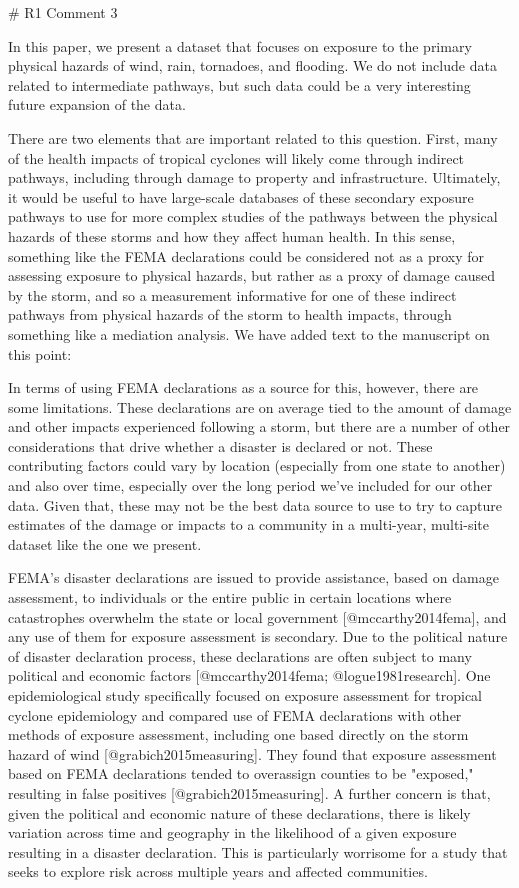 # R1 Comment 3

In this paper, we present a dataset that focuses on exposure to the primary
physical hazards of wind, rain, tornadoes, and flooding. We do not include data
related to intermediate pathways, but such data could be a very interesting
future expansion of the data.

There are two elements that are important related to this question. First, many
of the health impacts of tropical cyclones will likely come through indirect
pathways, including through damage to property and infrastructure. Ultimately,
it would be useful to have large-scale databases of these secondary exposure
pathways to use for more complex studies of the pathways between the physical
hazards of these storms and how they affect human health. In this sense,
something like the FEMA declarations could be considered not as a proxy for
assessing exposure to physical hazards, but rather as a proxy of damage caused
by the storm, and so a measurement informative for one of these indirect
pathways from physical hazards of the storm to health impacts, through something
like a mediation analysis. We have added text to the manuscript on this point:


In terms of using FEMA declarations as a source for this, however, there are 
some limitations. These declarations are on average tied to the amount of 
damage and other impacts experienced following a storm, but there are a number
of other considerations that drive whether a disaster is declared or not. 
These contributing factors could vary by location (especially from one state
to another) and also over time, especially over the long period we've included
for our other data. Given that, these may not be the best data source to use
to try to capture estimates of the damage or impacts to a community in a multi-year, 
multi-site dataset like the one we present.

FEMA's disaster declarations are issued to provide assistance, based on damage
assessment, to individuals or the entire public in certain locations where
catastrophes overwhelm the state or local government [@mccarthy2014fema], and
any use of them for exposure assessment is secondary. Due to the political
nature of disaster declaration process, these declarations are often subject to
many political and economic factors [@mccarthy2014fema; @logue1981research]. One
epidemiological study specifically focused on exposure assessment for tropical
cyclone epidemiology and compared use of FEMA declarations with other methods of
exposure assessment, including one based directly on the storm hazard of wind
[@grabich2015measuring]. They found that exposure assessment based on FEMA
declarations tended to overassign counties to be "exposed," resulting in false
positives [@grabich2015measuring]. A further concern is that, given the
political and economic nature of these declarations, there is likely variation
across time and geography in the likelihood of a given exposure resulting in a
disaster declaration. This is particularly worrisome for a study that seeks to
explore risk across multiple years and affected communities.


